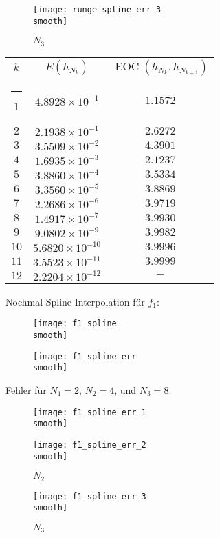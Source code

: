 \documentclass[]{scrartcl}
\makeatletter
\newcommand{\thickhline}{%
    \noalign {\ifnum 0=`}\fi \hrule height 1pt
    \futurelet \reserved@a \@xhline
}
\makeatother
\begin{document}
 	\begin{figure}[h]
 		\centering
		\texttt{[image: runge\_spline\_err\_3\\smooth]}
		\caption{$N_3$\label{Abb.9}}
 	\end{figure}
 	
 	\renewcommand{\arraystretch}{1.2}
 	\begin{tabular}{|c|c|c|}\hline
 	$k$  & $E(h_{N_k})$ & $\operatorname{EOC}(h_{N_k},h_{N_{k+1}})$\\\thickhline
 	$1$  & $4.8928\times10^{-1}$ & $1.1572$\\\hline
 	$2$  & $2.1938\times10^{-1}$ & $2.6272$\\\hline
 	$3$  & $3.5509\times10^{-2}$ & $4.3901$\\\hline
 	$4$  & $1.6935\times10^{-3}$ & $2.1237$\\\hline
 	$5$  & $3.8860\times10^{-4}$ & $3.5334$\\\hline
 	$6$  & $3.3560\times10^{-5}$ & $3.8869$\\\hline
 	$7$  & $2.2686\times10^{-6}$ & $3.9719$\\\hline
 	$8$  & $1.4917\times10^{-7}$ & $3.9930$\\\hline
 	$9$  & $9.0802\times10^{-9}$ & $3.9982$\\\hline
 	$10$ & $5.6820\times10^{-10}$ & $3.9996$\\\hline
 	$11$ & $3.5523\times10^{-11}$ & $3.9999$\\\hline
 	$12$ & $2.2204\times10^{-12}$ & $-$\\\hline
 	\end{tabular}
 	
 	Nochmal Spline-Interpolation für $f_1$:
	\begin{figure}[h]
		\centering
		\begin{minipage}{0.5\textwidth}
			\texttt{[image: f1\_spline\\smooth]}
			\caption{}
		\end{minipage}
		\begin{minipage}{0.49\textwidth}
			\texttt{[image: f1\_spline\_err\\smooth]}
			\caption{}
		\end{minipage}
	\end{figure} 
	
	Fehler für $N_1=2$, $N_2=4$, und $N_3=8$.
	\begin{figure}[h]
 		\centering
 		\begin{minipage}{0.5\textwidth}
 			\texttt{[image: f1\_spline\_err\_1\\smooth]}
 			\caption{$N_1$}
 		\end{minipage}
 		\begin{minipage}{0.49\textwidth}
 			\texttt{[image: f1\_spline\_err\_2\\smooth]}
 			\caption{$N_2$}
 		\end{minipage}
 	\end{figure}
 	
 	\begin{figure}[h]
 		\centering
		\texttt{[image: f1\_spline\_err\_3\\smooth]}
		\caption{$N_3$}
 	\end{figure}
\end{document}
